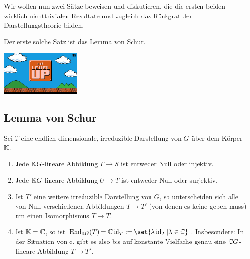 
\begin{minipage}{10cm}
\begin{remark}
Wir wollen nun zwei Sätze beweisen und diskutieren, die die ersten beiden wirklich nichttrivialen Resultate und zugleich das Rückgrat der Darstellungstheorie bilden.

\smallbreak
Der erste solche Satz ist das Lemma von Schur.\footnotemark
\end{remark}
\end{minipage}\hfill
\begin{minipage}{4cm}
\setlength{\baselineskip}{7pt}
\includegraphics[width=4cm]{pictures/levelup1.jpg}
\end{minipage}


\subsection{Lemma von Schur}
\begin{theorem}\label{darstellungen:schur}
Sei $T$ eine endlich-dimensionale, irreduzible Darstellung von $G$ über dem Körper $\mathbb{K}$.
\begin{enumerate}
\item Jede $\mathbb{K} G$-lineare Abbildung $T\to S$ ist entweder Null oder injektiv.
\item Jede $\mathbb{K} G$-lineare Abbildung $U\to T$ ist entweder Null oder surjektiv.
\item Ist $T'$ eine weitere irreduzible Darstellung von $G$, so unterscheiden sich alle von Null verschiedenen Abbildungen $T\to T'$ (von denen es keine geben muss) um einen Isomorphismus $T\to T$.
\item Ist $\mathbb{K}=\mathbb{C}$, so ist $\End_{\IK G}(T) = \IC\id_T := \set{\lambda\id_T | \lambda\in\IC}$. Insbesondere: In der Situation von c. gibt es also bis auf konstante Vielfache genau eine $\mathbb{C} G$-lineare Abbildung $T\to T'$.
\end{enumerate}
\end{theorem}

